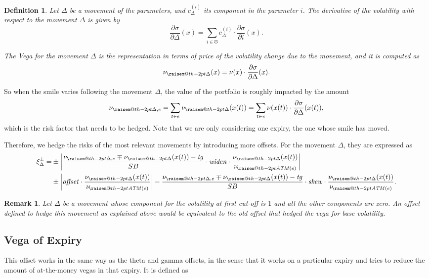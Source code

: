 \documentclass[10pt, a4paper, oneside]{article}
\makeatletter
\newtheorem*{remark}{Remark}
\newtheorem*{definition}{Definition}
\newcommand{\raisemath}[1]{\mathpalette{\raisem@th{#1}}}
\newcommand{\raisem@th}[3]{\raisebox{#1}{$#2#3$}}
\newcommand{\atm}{\ensuremath{\mathit{ATM}}}
\newcommand{\params}{\ensuremath{\mho}}
\newcommand{\vega}{\ensuremath{\nu}}
\newcommand{\volatility}{\ensuremath{\sigma}}
\newcommand{\atmvega}{\ensuremath{{\vega_{\!\raisemath{-2pt}{\atm(e)}}}}}
\newcommand{\offsetbs}{\ensuremath{\xi^{\pm}}}
\newcommand{\target}{\ensuremath{\mathit{tg}}}
\newcommand{\widen}{\ensuremath{\mathit{widen}}}
\newcommand{\skw}{\ensuremath{\mathit{skew}}}
\newcommand{\offset}{\ensuremath{\mathit{offset}}}
\newcommand{\skewunits}[3]{\ensuremath{\frac{{#1}\mp{#2}-\target}{{#3}}}}
\makeatother
\begin{document}
\begin{definition} Let $\Delta$ be a movement of the parameters, and $c_\Delta^{(i)}$ its component in the parameter $i$. The \emph{derivative of the volatility with respect to the movement} $\Delta$ is given by
 \[\frac{\partial \volatility}{\partial \Delta}(x) = \sum_{i \in \params} c_\Delta^{(i)}\cdot \frac{\partial \volatility}{\partial i}(x). \]
 
\noindent The \emph{Vega for the movement $\Delta$} is the representation in terms of price of the volatility change due to the movement, and it is computed as
\[\vega_{\raisemath{-2pt}{\Delta}}(x) = \vega(x) \cdot \frac{\partial \volatility}{\partial \Delta}(x).\]
\end{definition}

\noindent So when the smile varies following the movement $\Delta$, the value of the portfolio is roughly impacted by the amount
\[\vega_{\raisemath{-2pt}{\Delta, e}} = \sum_{t \in e} \vega_{\raisemath{-2pt}{\Delta}}(x(t)) = \sum_{t \in e} \vega(x(t)) \cdot \frac{\partial \volatility}{\partial \Delta}(x(t)),\]
which is the risk factor that needs to be hedged. Note that we are only considering one expiry, the one whose smile has moved.

\noindent Therefore, we hedge the risks of the most relevant movements by introducing more offsets. For the movement $\Delta$, they are expressed as
\newcommand{\movementoffsetformula}[5]{{\begin{align*}\offsetbs_{#5}=&\pm\left|\skewunits{#1}{#4}{#3}\cdot\widen\cdot{#2}\right| \\&\pm \left|\offset\cdot{#2}\right| - \skewunits{#1}{#4}{#3}\cdot\skw\cdot{#2}.\end{align*}}}
\movementoffsetformula{\vega_{\raisemath{-2pt}{\Delta, e}}}{\frac{\vega_{\raisemath{-2pt}{\Delta}}(x(t))}{\atmvega}}{SB}{\vega_{\raisemath{-2pt}{\Delta}}(x(t))}{\Delta}

\begin{remark}
 Let $\Delta$ be a movement whose component for the \emph{volatility at first cut-off} is $1$ and all the other components are zero. An offset defined to hedge this movement as explained above would be equivalent to the old
 offset that hedged the \emph{vega for base volatility}.
\end{remark}





\subsection{Vega of Expiry}
\noindent This offset works in the same way as the theta and gamma offsets, in the sense that it works on a particular expiry and tries to reduce the amount of at-the-money vegas in that expiry. It is defined as
\end{document}
